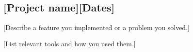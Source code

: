 \subsection{[Project name]\hfill [Dates]}
\begin{zitemize}
  \item {[Describe a feature you implemented or a problem you solved.]}
  \item {[List relevant tools and how you used them.]}
\end{zitemize}

